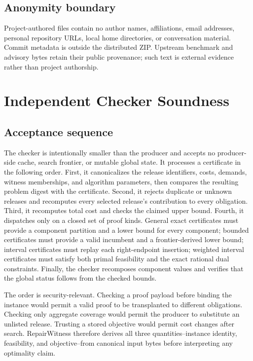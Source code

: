 \documentclass[10pt,conference]{IEEEtran}
\begin{document}
\subsection{Anonymity boundary}
Project-authored files contain no author names, affiliations, email addresses, personal repository URLs, local home directories, or conversation material. Commit metadata is outside the distributed ZIP. Upstream benchmark and advisory bytes retain their public provenance; such text is external evidence rather than project authorship.

\section{Independent Checker Soundness}
\subsection{Acceptance sequence}
The checker is intentionally smaller than the producer and accepts no producer-side cache, search frontier, or mutable global state. It processes a certificate in the following order. First, it canonicalizes the release identifiers, costs, demands, witness memberships, and algorithm parameters, then compares the resulting problem digest with the certificate. Second, it rejects duplicate or unknown releases and recomputes every selected release's contribution to every obligation. Third, it recomputes total cost and checks the claimed upper bound. Fourth, it dispatches only on a closed set of proof kinds. General exact certificates must provide a component partition and a lower bound for every component; bounded certificates must provide a valid incumbent and a frontier-derived lower bound; interval certificates must replay each right-endpoint insertion; weighted interval certificates must satisfy both primal feasibility and the exact rational dual constraints. Finally, the checker recomposes component values and verifies that the global status follows from the checked bounds.

The order is security-relevant. Checking a proof payload before binding the instance would permit a valid proof to be transplanted to different obligations. Checking only aggregate coverage would permit the producer to substitute an unlisted release. Trusting a stored objective would permit cost changes after search. RepairWitness therefore derives all three quantities--instance identity, feasibility, and objective--from canonical input bytes before interpreting any optimality claim.
\end{document}
